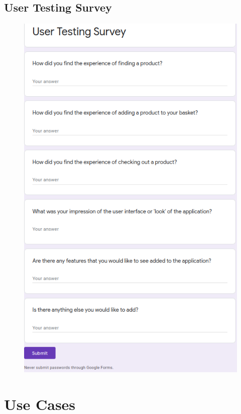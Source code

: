 \documentclass[12pt]{article}
\begin{document}
	\subsection{User Testing Survey}
	\label{user-testing-survey}
	\begin{figure}[H]
		\centering
		\includegraphics[scale=0.6]{images/user-testing-survey.png}
	\end{figure}
	
	\pagebreak
	
	\section{Use Cases}
	\label{chap:use-cases}
		
\end{document}
